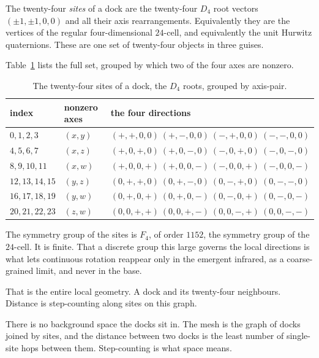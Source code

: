 \begin{definition}
The twenty-four \emph{sites} of a dock are the twenty-four $D_4$ root vectors $(\pm 1, \pm 1, 0, 0)$ and all their axis rearrangements. Equivalently they are the vertices of the regular four-dimensional $24$-cell, and equivalently the unit Hurwitz quaternions. These are one set of twenty-four objects in three guises.
\end{definition}

Table~\ref{tab:the-twenty-four-sites} lists the full set, grouped by which two of the four axes are nonzero.

\begin{table}[ht]
\centering
\begin{tabular}{@{}lll@{}}
\toprule
index & nonzero axes & the four directions \\
\midrule
$0,1,2,3$ & $(x,y)$ & $(+,+,0,0)\ (+,-,0,0)\ (-,+,0,0)\ (-,-,0,0)$ \\
$4,5,6,7$ & $(x,z)$ & $(+,0,+,0)\ (+,0,-,0)\ (-,0,+,0)\ (-,0,-,0)$ \\
$8,9,10,11$ & $(x,w)$ & $(+,0,0,+)\ (+,0,0,-)\ (-,0,0,+)\ (-,0,0,-)$ \\
$12,13,14,15$ & $(y,z)$ & $(0,+,+,0)\ (0,+,-,0)\ (0,-,+,0)\ (0,-,-,0)$ \\
$16,17,18,19$ & $(y,w)$ & $(0,+,0,+)\ (0,+,0,-)\ (0,-,0,+)\ (0,-,0,-)$ \\
$20,21,22,23$ & $(z,w)$ & $(0,0,+,+)\ (0,0,+,-)\ (0,0,-,+)\ (0,0,-,-)$ \\
\bottomrule
\end{tabular}
\caption{The twenty-four sites of a dock, the $D_4$ roots, grouped by axis-pair.}
\label{tab:the-twenty-four-sites}
\end{table}

The symmetry group of the sites is $F_4$, of order $1152$, the symmetry group of the $24$-cell. It is finite. That a discrete group this large governs the local directions is what lets continuous rotation reappear only in the emergent infrared, as a coarse-grained limit, and never in the base.

That is the entire local geometry. A dock and its twenty-four neighbours. Distance is step-counting along sites on this graph.

\begin{principle}
There is no background space the docks sit in. The mesh is the graph of docks joined by sites, and the distance between two docks is the least number of single-site hops between them. Step-counting is what space means.
\end{principle}

